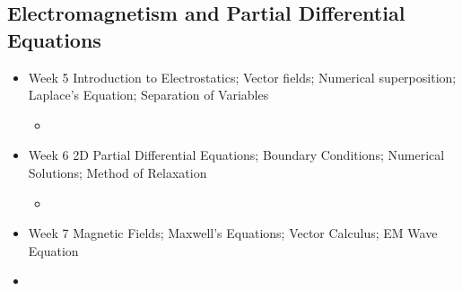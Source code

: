 \documentclass[letterpaper,10pt,english]{jupyterBook}
\begin{document}
\subsection{Electromagnetism and Partial Differential Equations}
\label{\detokenize{content/0_course/5_calendar:electromagnetism-and-partial-differential-equations}}\begin{itemize}
\item {} 
\sphinxAtStartPar
Week 5 \sphinxhyphen{} Introduction to Electrostatics; Vector fields; Numerical superposition; Laplace’s Equation; Separation of Variables
\begin{itemize}
\item {} 
\sphinxAtStartPar
{}

\end{itemize}

\item {} 
\sphinxAtStartPar
Week 6 \sphinxhyphen{} 2D Partial Differential Equations; Boundary Conditions; Numerical Solutions; Method of Relaxation
\begin{itemize}
\item {} 
\sphinxAtStartPar
{}

\end{itemize}

\item {} 
\sphinxAtStartPar
Week  7 \sphinxhyphen{} Magnetic Fields; Maxwell’s Equations; Vector Calculus; EM Wave Equation

\item {} 
\sphinxAtStartPar
{}

\end{itemize}
\end{document}
